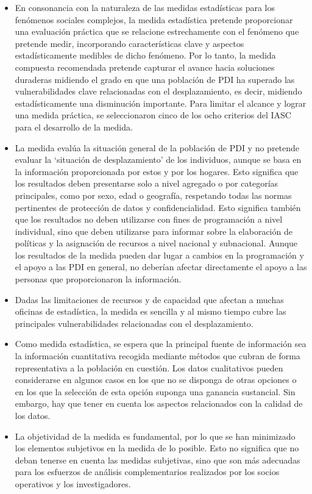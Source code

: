 \documentclass[
]{book}
\providecommand{\tightlist}{%
  \setlength{\itemsep}{0pt}\setlength{\parskip}{0pt}}
\begin{document}
\begin{itemize}
\tightlist
\item
  En consonancia con la naturaleza de las medidas estadísticas para los fenómenos sociales complejos, la medida estadística pretende proporcionar una evaluación práctica que se relacione estrechamente con el fenómeno que pretende medir, incorporando características clave y aspectos estadísticamente medibles de dicho fenómeno. Por lo tanto, la medida compuesta recomendada pretende capturar el avance hacia soluciones duraderas midiendo el grado en que una población de PDI ha superado las vulnerabilidades clave relacionadas con el desplazamiento, es decir, midiendo estadísticamente una disminución importante. Para limitar el alcance y lograr una medida práctica, se seleccionaron cinco de los ocho criterios del IASC para el desarrollo de la medida.
\item
  La medida evalúa la situación general de la población de PDI y no pretende evaluar la `situación de desplazamiento' de los individuos, aunque se basa en la información proporcionada por estos y por los hogares. Esto significa que los resultados deben presentarse solo a nivel agregado o por categorías principales, como por sexo, edad o geografía, respetando todas las normas pertinentes de protección de datos y confidencialidad. Esto significa también que los resultados no deben utilizarse con fines de programación a nivel individual, sino que deben utilizarse para informar sobre la elaboración de políticas y la asignación de recursos a nivel nacional y subnacional. Aunque los resultados de la medida pueden dar lugar a cambios en la programación y el apoyo a las PDI en general, no deberían afectar directamente el apoyo a las personas que proporcionaron la información.
\item
  Dadas las limitaciones de recursos y de capacidad que afectan a muchas oficinas de estadística, la medida es sencilla y al mismo tiempo cubre las principales vulnerabilidades relacionadas con el desplazamiento.
\item
  Como medida estadística, se espera que la principal fuente de información sea la información cuantitativa recogida mediante métodos que cubran de forma representativa a la población en cuestión. Los datos cualitativos pueden considerarse en algunos casos en los que no se disponga de otras opciones o en los que la selección de esta opción suponga una ganancia sustancial. Sin embargo, hay que tener en cuenta los aspectos relacionados con la calidad de los datos.
\item
  La objetividad de la medida es fundamental, por lo que se han minimizado los elementos subjetivos en la medida de lo posible. Esto no significa que no deban tenerse en cuenta las medidas subjetivas, sino que son más adecuadas para los esfuerzos de análisis complementarios realizados por los socios operativos y los investigadores.
\end{itemize}
\end{document}
